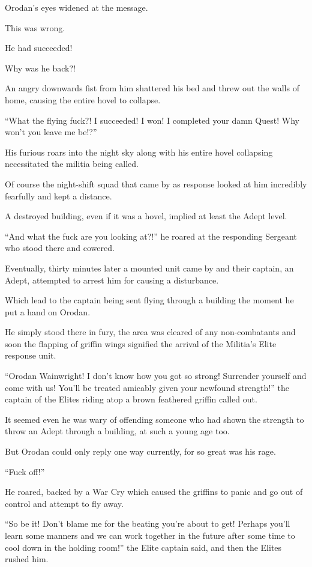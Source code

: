 \documentclass[a4paper,10pt]{book}
\begin{document}
Orodan’s eyes widened at the message.\par
This was wrong.\par
He had succeeded!\par
Why was he back?!\par
An angry downwards fist from him shattered his bed and threw out the walls of home, causing the entire hovel to collapse.\par
“What the flying fuck?! I succeeded! I won! I completed your damn Quest! Why won’t you leave me be!?”\par
His furious roars into the night sky along with his entire hovel collapsing necessitated the militia being called.\par
Of course the night-shift squad that came by as response looked at him incredibly fearfully and kept a distance.\par
A destroyed building, even if it was a hovel, implied at least the Adept level.\par
“And what the fuck are you looking at?!” he roared at the responding Sergeant who stood there and cowered.\par
Eventually, thirty minutes later a mounted unit came by and their captain, an Adept, attempted to arrest him for causing a disturbance.\par
Which lead to the captain being sent flying through a building the moment he put a hand on Orodan.\par
He simply stood there in fury, the area was cleared of any non-combatants and soon the flapping of griffin wings signified the arrival of the Militia’s Elite response unit.\par
“Orodan Wainwright! I don’t know how you got so strong! Surrender yourself and come with us! You’ll be treated amicably given your newfound strength!” the captain of the Elites riding atop a brown feathered griffin called out.\par
It seemed even he was wary of offending someone who had shown the strength to throw an Adept through a building, at such a young age too.\par
But Orodan could only reply one way currently, for so great was his rage.\par
“Fuck off!”\par
He roared, backed by a War Cry which caused the griffins to panic and go out of control and attempt to fly away.\par
“So be it! Don’t blame me for the beating you’re about to get! Perhaps you’ll learn some manners and we can work together in the future after some time to cool down in the holding room!” the Elite captain said, and then the Elites rushed him.\par
\end{document}

